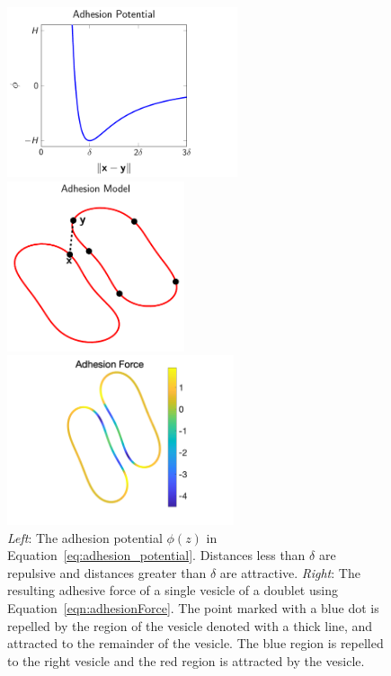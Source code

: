 \documentclass[prf,superscriptaddress,showpacs]{revtex4-1}
\begin{document}
\begin{figure}[htp]
  \begin{minipage}{0.31\textwidth}
    \centering
    \includegraphics[height=5cm,trim={0cm 0cm 2cm 0cm},clip]{figs/adhesionPotential.pdf}
  \end{minipage}
  \hfill
  \begin{minipage}{0.31\textwidth}
    \centering
    \includegraphics[height=5cm]{figs/configCartoon.pdf}
  \end{minipage}
  \hfill
  \begin{minipage}{0.31\textwidth}
    \centering
    \includegraphics[height=5cm,trim={3cm 0cm 2cm 0cm},clip]{figs/Adhesion_Force.png}
  \end{minipage}
  \caption{\label{fig:adhesionModel} {\em Left}: The adhesion potential
  $\phi(z)$ in Equation~\eqref{eq:adhesion_potential}.  Distances less
  than $\delta$ are repulsive and distances greater than $\delta$ are 
  attractive.  {\em Right}: The resulting adhesive force of a single
  vesicle of a doublet using Equation~\eqref{eqn:adhesionForce}.  The
  point marked with a blue dot is repelled by the region of the vesicle
  denoted with a thick line, and attracted to the remainder of the
  vesicle.  The blue region is repelled to the right vesicle and the red
  region is attracted by the vesicle.}
\end{figure}
\end{document}
